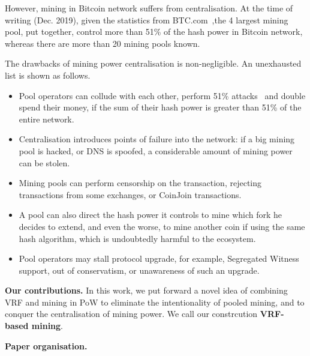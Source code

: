 However, mining in Bitcoin network suffers from centralisation.
At the time of writing (Dec. 2019), given the statistics from BTC.com~\cite{btc-com},the 4 largest mining pool, put together, control more than 51\% of the hash power in Bitcoin network, whereas there are more than 20 mining pools known.

The drawbacks of mining power centralisation is non-negligible.
An unexhausted list is shown as follows.

\begin{itemize}
    \item Pool operators can collude with each other, perform 51\% attacks~\cite{} and double spend their money, if the sum of their hash power is greater than 51\% of the entire network. 
    \item Centralisation introduces points of failure into the network: if a big mining pool is hacked, or DNS is spoofed, a considerable amount of mining power can be stolen.
    \item Mining pools can perform censorship on the transaction, rejecting transactions from some exchanges, or CoinJoin transactions.
    \item A pool can also direct the hash power it controls to mine which fork he decides to extend, and even the worse, to mine another coin if using the same hash algorithm, which is undoubtedly harmful to the ecosystem.
    \item Pool operators may stall protocol upgrade, for example, Segregated Witness~\cite{segwit} support, out of conservatism, or unawareness of such an upgrade.
\end{itemize}


\textbf{Our contributions.}
In this work, we put forward a novel idea of combining VRF and mining in PoW to eliminate the intentionality of pooled mining, and to conquer the centralisation of mining power. We call our constrcution \textbf{VRF-based mining}.


\textbf{Paper organisation.}
